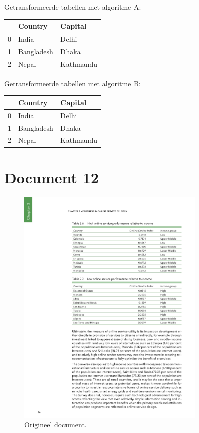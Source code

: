Getransformeerde tabellen met algoritme A:

\begin{tabular}{lll}
\toprule
{} &     Country &    Capital \\
\midrule
0 &       India &      Delhi \\
1 &  Bangladesh &      Dhaka \\
2 &       Nepal &  Kathmandu \\
\bottomrule
\end{tabular}

Getransformeerde tabellen met algoritme B:

\begin{tabular}{lll}
\toprule
{} &     Country &    Capital \\
\midrule
0 &       India &      Delhi \\
1 &  Bangladesh &      Dhaka \\
2 &       Nepal &  Kathmandu \\
\bottomrule
\end{tabular}
\section{Document 12}

\begin{figure}[H]
    \centering
    \includegraphics[width=0.8\textwidth]{test-resultaten/12/original.png}
    \caption{Origineel document.}
\end{figure}

